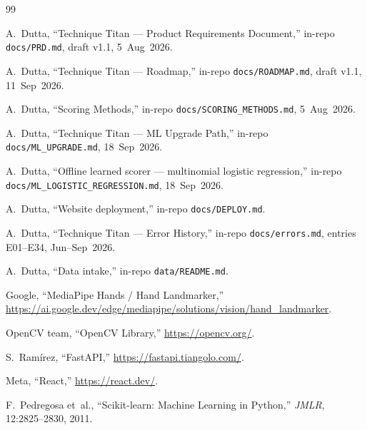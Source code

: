 \documentclass[11pt,a4paper]{article}
\begin{document}
\begin{thebibliography}{99}

A.~Dutta, \enquote{Technique Titan --- Product Requirements Document,} in-repo \texttt{docs/PRD.md}, draft v1.1, 5~Aug~2026.

A.~Dutta, \enquote{Technique Titan --- Roadmap,} in-repo \texttt{docs/ROADMAP.md}, draft v1.1, 11~Sep~2026.

A.~Dutta, \enquote{Scoring Methods,} in-repo \texttt{docs/SCORING\_METHODS.md}, 5~Aug~2026.

A.~Dutta, \enquote{Technique Titan --- ML Upgrade Path,} in-repo \texttt{docs/ML\_UPGRADE.md}, 18~Sep~2026.

A.~Dutta, \enquote{Offline learned scorer --- multinomial logistic regression,} in-repo \texttt{docs/ML\_LOGISTIC\_REGRESSION.md}, 18~Sep~2026.

A.~Dutta, \enquote{Website deployment,} in-repo \texttt{docs/DEPLOY.md}.

A.~Dutta, \enquote{Technique Titan --- Error History,} in-repo \texttt{docs/errors.md}, entries E01--E34, Jun--Sep~2026.

A.~Dutta, \enquote{Data intake,} in-repo \texttt{data/README.md}.

Google, \enquote{MediaPipe Hands / Hand Landmarker,} \url{https://ai.google.dev/edge/mediapipe/solutions/vision/hand_landmarker}.

OpenCV team, \enquote{OpenCV Library,} \url{https://opencv.org/}.

S.~Ram\'irez, \enquote{FastAPI,} \url{https://fastapi.tiangolo.com/}.

Meta, \enquote{React,} \url{https://react.dev/}.

F.~Pedregosa et~al., \enquote{Scikit-learn: Machine Learning in Python,} \textit{JMLR}, 12:2825--2830, 2011.

\end{thebibliography}
\end{document}
